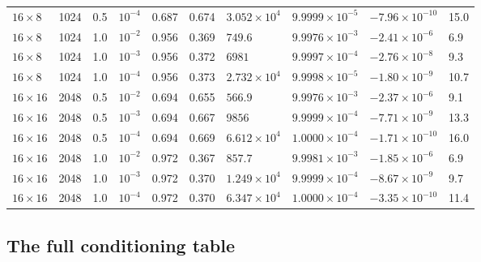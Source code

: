 \begin{table}
{\begin{tabular}{llllllllll}
$16\times8$ & 1024 & 0.5 & $10^{-4}$ & 0.687 & 0.674 & $3.052\times10^{4}$ & $9.9999\times10^{-5}$ & $-7.96\times10^{-10}$ & 15.0 \\
$16\times8$ & 1024 & 1.0 & $10^{-2}$ & 0.956 & 0.369 & $749.6$ & $9.9976\times10^{-3}$ & $-2.41\times10^{-6}$ & 6.9 \\
$16\times8$ & 1024 & 1.0 & $10^{-3}$ & 0.956 & 0.372 & $6981$ & $9.9997\times10^{-4}$ & $-2.76\times10^{-8}$ & 9.3 \\
$16\times8$ & 1024 & 1.0 & $10^{-4}$ & 0.956 & 0.373 & $2.732\times10^{4}$ & $9.9998\times10^{-5}$ & $-1.80\times10^{-9}$ & 10.7 \\
$16\times16$ & 2048 & 0.5 & $10^{-2}$ & 0.694 & 0.655 & $566.9$ & $9.9976\times10^{-3}$ & $-2.37\times10^{-6}$ & 9.1 \\
$16\times16$ & 2048 & 0.5 & $10^{-3}$ & 0.694 & 0.667 & $9856$ & $9.9999\times10^{-4}$ & $-7.71\times10^{-9}$ & 13.3 \\
$16\times16$ & 2048 & 0.5 & $10^{-4}$ & 0.694 & 0.669 & $6.612\times10^{4}$ & $1.0000\times10^{-4}$ & $-1.71\times10^{-10}$ & 16.0 \\
$16\times16$ & 2048 & 1.0 & $10^{-2}$ & 0.972 & 0.367 & $857.7$ & $9.9981\times10^{-3}$ & $-1.85\times10^{-6}$ & 6.9 \\
$16\times16$ & 2048 & 1.0 & $10^{-3}$ & 0.972 & 0.370 & $1.249\times10^{4}$ & $9.9999\times10^{-4}$ & $-8.67\times10^{-9}$ & 9.7 \\
$16\times16$ & 2048 & 1.0 & $10^{-4}$ & 0.972 & 0.370 & $6.347\times10^{4}$ & $1.0000\times10^{-4}$ & $-3.35\times10^{-10}$ & 11.4 \\
\bottomrule
\end{tabular}%
}
\end{table}

\subsection{The full conditioning table}
\label{ch3:appE:fulltable}

